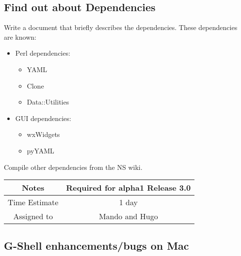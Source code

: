 \documentclass[12pt]{article}
\begin{document}
\subsection{Find out about Dependencies}

Write a document that briefly describes the dependencies.  These
dependencies are known:
\begin{itemize}
\item Perl dependencies:
  \begin{itemize}
  \item YAML
  \item Clone
  \item Data::Utilities
  \end{itemize}
\item GUI dependencies:
  \begin{itemize}
  \item wxWidgets
  \item pyYAML
  \end{itemize}
\end{itemize}

Compile other dependencies from the NS wiki.

{
  \vspace{5mm}
  \centering
  \begin{tabular}{|c|c|}
    \hline
    Notes
    & Required for alpha1 Release 3.0 \\
    \hline
    Time Estimate
    & 1 day \\
    \hline
    Assigned to
    & Mando and Hugo \\
    \hline
  \end{tabular}
}


\subsection{G-Shell enhancements/bugs on Mac}
\end{document}
